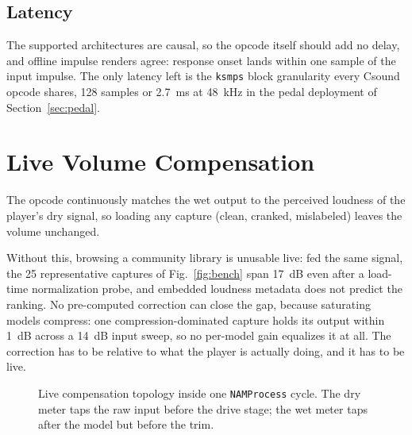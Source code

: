 \documentclass[runningheads,a4paper]{llncs}
\begin{document}
\subsection{Latency}
\label{sec:latency}

The supported architectures are causal, so the opcode itself should add
no delay, and offline impulse renders agree: response onset lands
within one sample of the input impulse. The only latency left is the
\texttt{ksmps} block granularity every Csound opcode shares, 128
samples or 2.7~ms at 48~kHz in the pedal deployment of
Section~\ref{sec:pedal}.

\section{Live Volume Compensation}
\label{sec:volume}

The opcode continuously matches the wet output to the perceived loudness
of the player's dry signal, so loading any capture (clean, cranked,
mislabeled) leaves the volume unchanged.

Without this, browsing a community library is unusable live: fed the
same signal, the 25 representative captures of Fig.~\ref{fig:bench}
span 17~dB even after a load-time normalization probe, and embedded
loudness metadata does not predict the ranking. No pre-computed
correction can close the gap, because saturating models compress: one
compression-dominated capture holds its output within 1~dB across a
14~dB input sweep, so no per-model gain equalizes it at all. The
correction has to be relative to what the player is actually doing,
and it has to be live.

\begin{figure}
\centering
{}
\caption{Live compensation topology inside one \texttt{NAMProcess}
cycle. The dry meter taps the raw input before the drive stage; the
wet meter taps after the model but before the trim.}
\label{fig:comp}
\end{figure}
\end{document}
